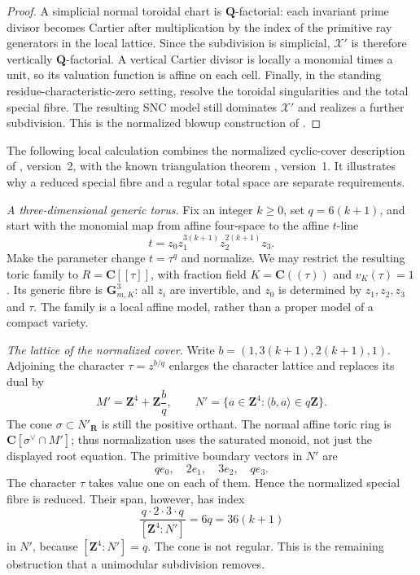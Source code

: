\begin{proof}
A simplicial normal toroidal chart is $\mathbf Q$-factorial: each invariant
prime divisor becomes Cartier after multiplication by the index of the
primitive ray generators in the local lattice.  Since the subdivision is
simplicial, $\mathcal X'$ is therefore vertically $\mathbf Q$-factorial.
A vertical Cartier divisor is locally a monomial times a unit, so its
valuation function is affine on each cell.  Finally, in the standing
residue-characteristic-zero setting, resolve the toroidal singularities and
the total special fibre.  The resulting SNC model still dominates
$\mathcal X'$ and realizes a further subdivision.  This is the normalized
blowup construction of \cite[Theorem~3.15]{BFJ16}.
\end{proof}

\begin{example}
\label{ex:sylvester-height-slice}
The following local calculation combines the normalized cyclic-cover
description of \cite[Proposition~3.7]{AmbroCyclicV2}, version~2, with the
known triangulation theorem
\cite[Theorem~3.5]{CCJP26Sylvester}, version~1. It illustrates why a
reduced special fibre and a regular total space are separate requirements.

\emph{A three-dimensional generic torus.}
Fix an integer $k\ge0$, set $q=6(k+1)$, and start with the monomial
map from affine four-space to the affine $t$-line
\[
                  t=z_0z_1^{3(k+1)}z_2^{2(k+1)}z_3.
\]
Make the parameter change $t=\tau^q$ and normalize. We may restrict
the resulting toric family to $R=\mathbf C[[\tau]]$, with fraction
field $K=\mathbf C((\tau))$ and $v_K(\tau)=1$. Its generic fibre is
$\mathbf G_{m,K}^3$: all $z_i$ are invertible, and $z_0$ is determined
by $z_1,z_2,z_3$ and $\tau$. The family is a local affine model,
rather than a proper model of a compact variety.

\emph{The lattice of the normalized cover.}
Write $b=(1,3(k+1),2(k+1),1)$. Adjoining the character $\tau=z^{b/q}$
enlarges the character lattice and replaces its dual by
\[
 M'=\mathbf Z^4+\mathbf Z\frac bq,
 \qquad
 N'=\{a\in\mathbf Z^4:\langle b,a\rangle\in q\mathbf Z\}.
\]
The cone $\sigma\subset N'_{\mathbf R}$ is still the positive orthant.
The normal affine toric
ring is $\mathbf C[\sigma^\vee\cap M']$; thus normalization uses
the saturated monoid, not just the displayed root equation.
The primitive boundary vectors in $N'$ are
\[
                         qe_0,\quad 2e_1,\quad 3e_2,\quad qe_3.
\]
The character $\tau$ takes value one on each of them. Hence the
normalized special fibre is reduced. Their span, however, has index
\[
          \frac{q\cdot2\cdot3\cdot q}{[\mathbf Z^4:N']}
                  =6q=36(k+1)
\]
in $N'$, because $[\mathbf Z^4:N']=q$. The cone is not regular.
This is the remaining obstruction that a unimodular subdivision removes.


\end{example}
